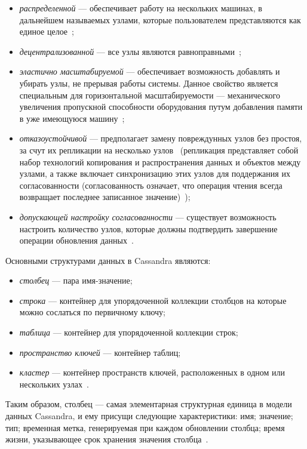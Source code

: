 \begin{itemize}
    \item \textit{распределенной} --- обеспечивает работу на нескольких машинах, в дальнейшем называемых узлами, которые пользователем представляются как единое целое~\cite{myref3};
    \item \textit{децентрализованной} --- все узлы являются равноправными~\cite{myref3};
    \item \textit{эластично масштабируемой} --- обеспечивает возможность добавлять и убирать узлы, не прерывая работы системы.
Данное свойство является специальным для горизонтальной масштабируемости --- механического увеличения пропускной способности оборудования путум добавления памяти в уже имеющуюся машину~\cite{myref3};
    \item \textit{отказоустойчивой} --- предполагает замену повреждунных узлов без простоя, за счут их репликации на несколько узлов~\cite{myref3}
(репликация представляет собой набор технологий копирования и распространения данных и объектов между узлами, а также включает синхронизацию этих узлов для поддержания их согласованности
(согласованность означает, что операция чтения всегда возвращает последнее записанное значение)~\cite{myref3, myref4});
    \item \textit{допускающей настройку согласованности} --- существует возможность настроить количество узлов, которые должны подтвердить завершение операции обновления данных~\cite{myref3}.
\end{itemize}
Основными структурами данных в Cassandra являются:
\begin{itemize}
\item \textit{столбец} --- пара имя-значение;
\item \textit{строка} --- контейнер для упорядоченной коллекции столбцов на которые можно сослаться по первичному ключу;
\item \textit{таблица} --- контейнер для упорядоченной коллекции строк;
\item \textit{пространство ключей} --- контейнер таблиц;
\item \textit{кластер} --- контейнер пространств ключей, расположенных в одном или нескольких узлах~\cite{myref3}.
\end{itemize}

Таким образом, столбец --- самая элементарная структурная единица в модели данных Cassandra, и ему присущи следующие характеристики:
имя; значение; тип; временная метка, генерируемая при каждом обновлении столбца; время жизни, указывающее срок хранения значения столбца~\cite{myref3}.

